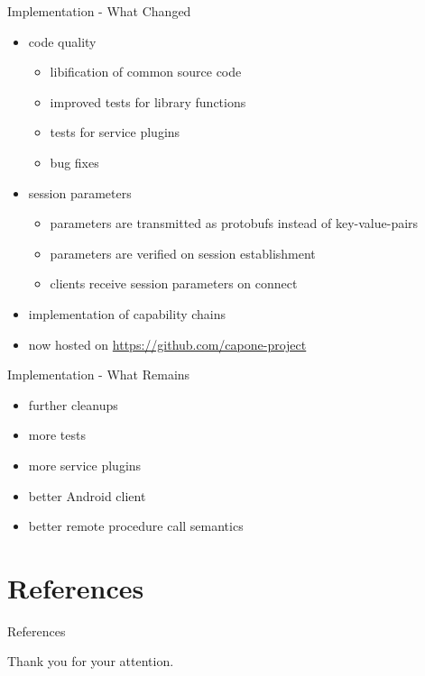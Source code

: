 \documentclass[a4paper]{beamer}
\begin{document}
\begin{frame}{Implementation - What Changed}
    \begin{itemize}
        \item code quality
            \begin{itemize}
                \item libification of common source code
                \item improved tests for library functions
                \item tests for service plugins
                \item bug fixes
            \end{itemize}
        \item session parameters
            \begin{itemize}
                \item parameters are transmitted as protobufs instead of key-value-pairs
                \item parameters are verified on session establishment
                \item clients receive session parameters on connect
            \end{itemize}
        \item implementation of capability chains
        \item now hosted on \url{https://github.com/capone-project}
    \end{itemize}
\end{frame}

\begin{frame}{Implementation - What Remains}
    \begin{itemize}
        \item further cleanups
        \item more tests
        \item more service plugins
        \item better Android client
        \item better remote procedure call semantics
    \end{itemize}
\end{frame}

\section{References}

\begin{frame}[allowframebreaks]{References}
    
    {\tiny }
\end{frame}

\begin{frame}[plain]
    \begin{center}
        Thank you for your attention.
    \end{center}
\end{frame}
\end{document}
